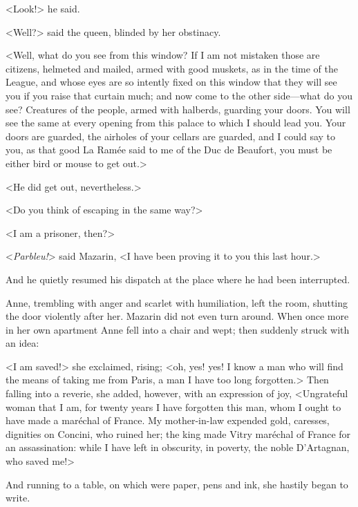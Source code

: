 <Look!> he said.

<Well?> said the queen, blinded by her obstinacy.

<Well, what do you see from this window? If I am not mistaken those are citizens, helmeted and mailed, armed with good muskets, as in the time of the League, and whose eyes are so intently fixed on this window that they will see you if you raise that curtain much; and now come to the other side—what do you see? Creatures of the people, armed with halberds, guarding your doors. You will see the same at every opening from this palace to which I should lead you. Your doors are guarded, the airholes of your cellars are guarded, and I could say to you, as that good La Ramée said to me of the Duc de Beaufort, you must be either bird or mouse to get out.>

<He did get out, nevertheless.>

<Do you think of escaping in the same way?>

<I am a prisoner, then?>

<\textit{Parbleu!}> said Mazarin, <I have been proving it to you this last hour.>

And he quietly resumed his dispatch at the place where he had been interrupted.

Anne, trembling with anger and scarlet with humiliation, left the room, shutting the door violently after her. Mazarin did not even turn around. When once more in her own apartment Anne fell into a chair and wept; then suddenly struck with an idea:

<I am saved!> she exclaimed, rising; <oh, yes! yes! I know a man who will find the means of taking me from Paris, a man I have too long forgotten.> Then falling into a reverie, she added, however, with an expression of joy, <Ungrateful woman that I am, for twenty years I have forgotten this man, whom I ought to have made a maréchal of France. My mother-in-law expended gold, caresses, dignities on Concini, who ruined her; the king made Vitry maréchal of France for an assassination: while I have left in obscurity, in poverty, the noble D'Artagnan, who saved me!>

And running to a table, on which were paper, pens and ink, she hastily began to write. 